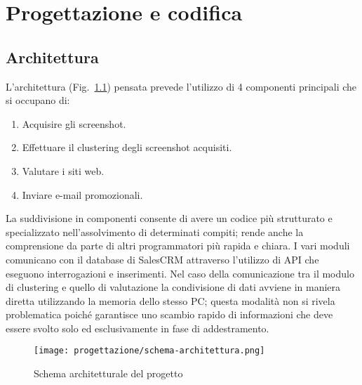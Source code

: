 \chapter{Progettazione e codifica}

\label{cap:progettazione}


\section{Architettura}
L'architettura (Fig.~\ref{fig:schema-architettura}) pensata prevede l'utilizzo di 4 componenti principali che si occupano di:
\begin{enumerate}
    \item Acquisire gli screenshot.
    \item Effettuare il clustering degli screenshot acquisiti.
    \item Valutare i siti web.
    \item Inviare e-mail promozionali.
\end{enumerate}
La suddivisione in componenti consente di avere un codice più strutturato e specializzato nell'assolvimento di determinati compiti; rende anche la comprensione da parte di altri programmatori più rapida e chiara.
I vari moduli comunicano con il database di SalesCRM attraverso l'utilizzo di API che eseguono interrogazioni e inserimenti.
Nel caso della comunicazione tra il modulo di clustering e quello di valutazione la condivisione di dati avviene in maniera diretta utilizzando la memoria dello stesso PC; questa modalità non si rivela problematica poiché garantisce uno scambio rapido di informazioni che deve essere svolto solo ed esclusivamente in fase di addestramento.

\begin{figure}[!h] 
    \centering 
    \texttt{[image: progettazione/schema-architettura.png]} 
    \caption{Schema architetturale del progetto}
    \label{fig:schema-architettura}
  \end{figure}


\newpage


